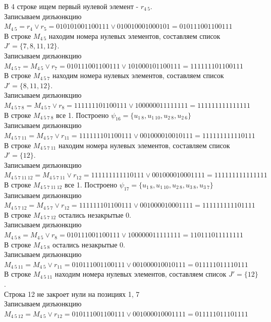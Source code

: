 \documentclass[a4paper,12pt]{article}
\begin{document}
\noindent
В 4 строке ищем первый нулевой элемент - $r_{4\ 5}$.\\
Записываем дизъюнкцию $M_{4\ 5} = r_{4}\lor r_{5} = 010101001100111 \lor 010010001000101 = 010111001100111$\\
В строке $M_{4\ 5}$ находим номера нулевых элементов, составляем список $J' = \{7, 8, 11, 12\}$.\\
Записываем дизъюнкцию $M_{4\ 5\ 7} = M_{4\ 5}\lor r_{7} = 010111001100111 \lor 101000101100111 = 111111101100111$\\
В строке $M_{4\ 5\ 7}$ находим номера нулевых элементов, составляем список $J' = \{8, 11, 12\}$.\\
Записываем дизъюнкцию $M_{4\ 5\ 7\ 8} = M_{4\ 5\ 7}\lor r_{8} = 111111101100111 \lor 100000011111111 = 111111111111111$\\
В строке $M_{4\ 5\ 7\ 8}$ все 1. Построено $\psi_{16} = \{u_{1\ 8},u_{1\ 10},u_{2\ 8},u_{2\ 6}\}$\\
Записываем дизъюнкцию $M_{4\ 5\ 7\ 11} = M_{4\ 5\ 7}\lor r_{11} = 111111101100111 \lor 001000010010111 = 111111111110111$\\
В строке $M_{4\ 5\ 7\ 11}$ находим номера нулевых элементов, составляем список $J' = \{12\}$.\\
Записываем дизъюнкцию $M_{4\ 5\ 7\ 11\ 12} = M_{4\ 5\ 7\ 11}\lor r_{12} = 111111111110111 \lor 001000010001111 = 111111111111111$\\
В строке $M_{4\ 5\ 7\ 11\ 12}$ все 1. Построено $\psi_{17} = \{u_{1\ 8},u_{1\ 10},u_{2\ 8},u_{3\ 8},u_{3\ 7}\}$\\
Записываем дизъюнкцию $M_{4\ 5\ 7\ 12} = M_{4\ 5\ 7}\lor r_{12} = 111111101100111 \lor 001000010001111 = 111111111101111$\\
В строке $M_{4\ 5\ 7\ 12}$ остались незакрытые 0.\\
Записываем дизъюнкцию $M_{4\ 5\ 8} = M_{4\ 5}\lor r_{8} = 010111001100111 \lor 100000011111111 = 110111011111111$\\
В строке $M_{4\ 5\ 8}$ остались незакрытые 0.\\
Записываем дизъюнкцию $M_{4\ 5\ 11} = M_{4\ 5}\lor r_{11} = 010111001100111 \lor 001000010010111 = 011111011110111$\\
В строке $M_{4\ 5\ 11}$ находим номера нулевых элементов, составляем список $J' = \{12\}$.\\
Строка 12 не закроет нули на позициях 1, 7\\
Записываем дизъюнкцию $M_{4\ 5\ 12} = M_{4\ 5}\lor r_{12} = 010111001100111 \lor 001000010001111 = 011111011101111$\\
\end{document}
